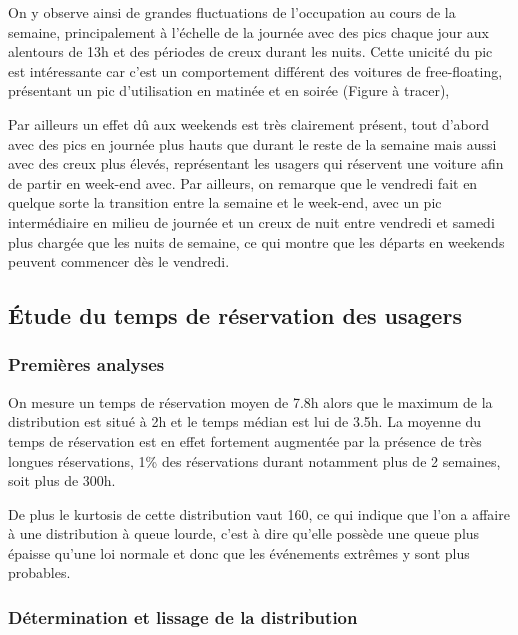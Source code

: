 \documentclass[12pt,a4paper]{article}
\newcommand{\1}[1]{\mathbbm{1}_{\{#1\}} }
\theoremstyle{definition}
\begin{document}
{On y observe ainsi de grandes fluctuations de l'occupation au cours de la semaine, principalement à l'échelle de la journée avec des pics chaque jour aux alentours de 13h et des périodes de creux durant les nuits.
Cette unicité du pic est intéressante car c'est un comportement différent des voitures de free-floating, présentant un pic d'utilisation en matinée et en soirée (Figure à tracer), 

Par ailleurs un effet dû aux weekends est très clairement présent, tout d'abord avec des pics en journée plus hauts que durant le reste de la semaine mais aussi avec des creux plus élevés, représentant les usagers qui réservent une voiture afin de partir en week-end avec. Par ailleurs, on remarque que le vendredi fait en quelque sorte la transition entre la semaine et le week-end, avec un pic intermédiaire en milieu de journée et un creux de nuit entre vendredi et samedi plus chargée que les nuits de semaine, ce qui montre que les départs en weekends peuvent commencer dès le vendredi.






\subsection{Étude du temps de réservation des usagers}


\subsubsection{Premières analyses}

On mesure un temps de réservation moyen de 7.8h alors que le maximum de la distribution est situé à 2h et le temps médian est lui de 3.5h. La moyenne du temps de réservation est en effet fortement augmentée par la présence de très longues réservations, 1\% des réservations durant notamment plus de 2 semaines, soit plus de 300h.

De plus le kurtosis de cette distribution vaut 160, ce qui indique que l'on a affaire à une distribution à queue lourde, c'est à dire qu'elle possède une queue plus épaisse qu'une loi normale et donc que les événements extrêmes y sont plus probables.



\subsubsection{Détermination et lissage de la distribution}

}
\end{document}
